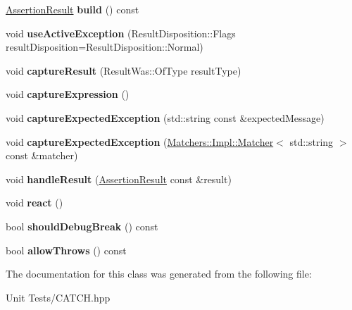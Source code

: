 \begin{DoxyCompactItemize}
\item 
\hyperlink{classCatch_1_1AssertionResult}{Assertion\+Result} {\bfseries build} () const \hypertarget{classCatch_1_1ResultBuilder_a31eba48feb02817d2151e31bd8331eeb}{}\label{classCatch_1_1ResultBuilder_a31eba48feb02817d2151e31bd8331eeb}

\item 
void {\bfseries use\+Active\+Exception} (Result\+Disposition\+::\+Flags result\+Disposition=Result\+Disposition\+::\+Normal)\hypertarget{classCatch_1_1ResultBuilder_a5bbd2f14a678f3e8d0f791ac6d233d65}{}\label{classCatch_1_1ResultBuilder_a5bbd2f14a678f3e8d0f791ac6d233d65}

\item 
void {\bfseries capture\+Result} (Result\+Was\+::\+Of\+Type result\+Type)\hypertarget{classCatch_1_1ResultBuilder_a10e467f7b7a4976e5d148b4d5066e8fd}{}\label{classCatch_1_1ResultBuilder_a10e467f7b7a4976e5d148b4d5066e8fd}

\item 
void {\bfseries capture\+Expression} ()\hypertarget{classCatch_1_1ResultBuilder_af2ae2343965802eeeb0abbd4ea9d2d36}{}\label{classCatch_1_1ResultBuilder_af2ae2343965802eeeb0abbd4ea9d2d36}

\item 
void {\bfseries capture\+Expected\+Exception} (std\+::string const \&expected\+Message)\hypertarget{classCatch_1_1ResultBuilder_a9ac96f6220c8dd8e4feee725c6228d77}{}\label{classCatch_1_1ResultBuilder_a9ac96f6220c8dd8e4feee725c6228d77}

\item 
void {\bfseries capture\+Expected\+Exception} (\hyperlink{structCatch_1_1Matchers_1_1Impl_1_1Matcher}{Matchers\+::\+Impl\+::\+Matcher}$<$ std\+::string $>$ const \&matcher)\hypertarget{classCatch_1_1ResultBuilder_a7d443d632eaeabe2cb36218b8dcb7400}{}\label{classCatch_1_1ResultBuilder_a7d443d632eaeabe2cb36218b8dcb7400}

\item 
void {\bfseries handle\+Result} (\hyperlink{classCatch_1_1AssertionResult}{Assertion\+Result} const \&result)\hypertarget{classCatch_1_1ResultBuilder_ad8bb17e4ac590b75bf8630d8f3502f4e}{}\label{classCatch_1_1ResultBuilder_ad8bb17e4ac590b75bf8630d8f3502f4e}

\item 
void {\bfseries react} ()\hypertarget{classCatch_1_1ResultBuilder_a3085cdc46533d45bed6f652a2ac295c0}{}\label{classCatch_1_1ResultBuilder_a3085cdc46533d45bed6f652a2ac295c0}

\item 
bool {\bfseries should\+Debug\+Break} () const \hypertarget{classCatch_1_1ResultBuilder_a34cdbf7ad1e5b3cb4a94047f2d14bcb2}{}\label{classCatch_1_1ResultBuilder_a34cdbf7ad1e5b3cb4a94047f2d14bcb2}

\item 
bool {\bfseries allow\+Throws} () const \hypertarget{classCatch_1_1ResultBuilder_a3dbf18a3a4b00173dab052a8864e435e}{}\label{classCatch_1_1ResultBuilder_a3dbf18a3a4b00173dab052a8864e435e}

\end{DoxyCompactItemize}


The documentation for this class was generated from the following file\+:\begin{DoxyCompactItemize}
\item 
Unit Tests/C\+A\+T\+C\+H.\+hpp\end{DoxyCompactItemize}

